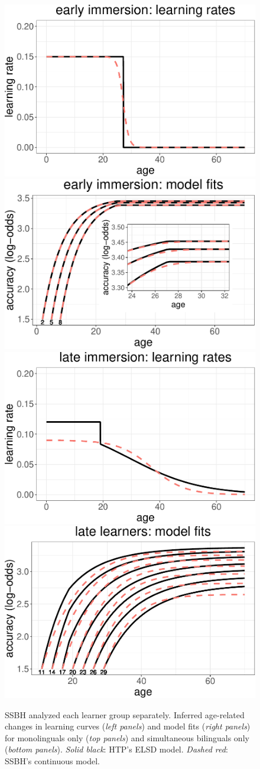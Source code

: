 \documentclass[
  english,
  doc,floatsintext]{apa6}
\begin{document}
\begin{figure}
\includegraphics[width=0.48\linewidth]{SlikResponse_rmd_files/figure-latex/immersion-1} \includegraphics[width=0.48\linewidth]{SlikResponse_rmd_files/figure-latex/immersion-2} \includegraphics[width=0.48\linewidth]{SlikResponse_rmd_files/figure-latex/immersion-3} \includegraphics[width=0.48\linewidth]{SlikResponse_rmd_files/figure-latex/immersion-4} \caption{SSBH analyzed each learner group separately. Inferred age-related changes in learning curves (\emph{left panels}) and model fits (\emph{right panels}) for monolinguals only (\emph{top panels}) and simultaneous bilinguals only (\emph{bottom panels}). \emph{Solid black}: HTP's ELSD model. \emph{Dashed red}: SSBH's continuous model.}\label{fig:immersion}
\end{figure}
\end{document}
